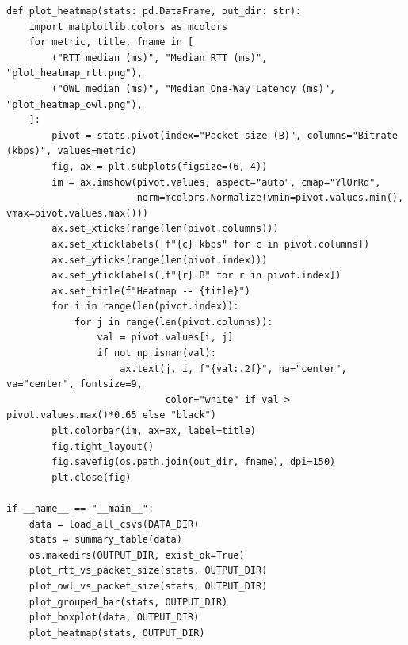 \begin{lstlisting}[style=appendix-py, caption={Latency vs.\ packet-size plotting}, label={lst:latency-pktsize-plot}]
def plot_heatmap(stats: pd.DataFrame, out_dir: str):
    import matplotlib.colors as mcolors
    for metric, title, fname in [
        ("RTT median (ms)", "Median RTT (ms)", "plot_heatmap_rtt.png"),
        ("OWL median (ms)", "Median One-Way Latency (ms)", "plot_heatmap_owl.png"),
    ]:
        pivot = stats.pivot(index="Packet size (B)", columns="Bitrate (kbps)", values=metric)
        fig, ax = plt.subplots(figsize=(6, 4))
        im = ax.imshow(pivot.values, aspect="auto", cmap="YlOrRd",
                       norm=mcolors.Normalize(vmin=pivot.values.min(), vmax=pivot.values.max()))
        ax.set_xticks(range(len(pivot.columns)))
        ax.set_xticklabels([f"{c} kbps" for c in pivot.columns])
        ax.set_yticks(range(len(pivot.index)))
        ax.set_yticklabels([f"{r} B" for r in pivot.index])
        ax.set_title(f"Heatmap -- {title}")
        for i in range(len(pivot.index)):
            for j in range(len(pivot.columns)):
                val = pivot.values[i, j]
                if not np.isnan(val):
                    ax.text(j, i, f"{val:.2f}", ha="center", va="center", fontsize=9,
                            color="white" if val > pivot.values.max()*0.65 else "black")
        plt.colorbar(im, ax=ax, label=title)
        fig.tight_layout()
        fig.savefig(os.path.join(out_dir, fname), dpi=150)
        plt.close(fig)

if __name__ == "__main__":
    data = load_all_csvs(DATA_DIR)
    stats = summary_table(data)
    os.makedirs(OUTPUT_DIR, exist_ok=True)
    plot_rtt_vs_packet_size(stats, OUTPUT_DIR)
    plot_owl_vs_packet_size(stats, OUTPUT_DIR)
    plot_grouped_bar(stats, OUTPUT_DIR)
    plot_boxplot(data, OUTPUT_DIR)
    plot_heatmap(stats, OUTPUT_DIR)
\end{lstlisting}

\endinput
